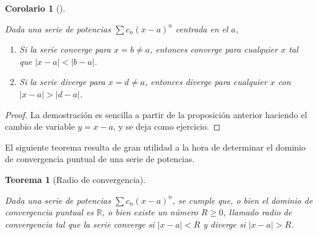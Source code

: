 \documentclass[
  a4paper,
]{scrreport}
\providecommand{\tightlist}{%
  \setlength{\itemsep}{0pt}\setlength{\parskip}{0pt}}\usepackage{longtable,booktabs,array}
\theoremstyle{definition}
\theoremstyle{plain}
\newtheorem{corollary}{Corolario}[chapter]
\theoremstyle{definition}
\theoremstyle{definition}
\theoremstyle{plain}
\newtheorem{theorem}{Teorema}[chapter]
\theoremstyle{plain}
\theoremstyle{remark}
\begin{document}
\begin{corollary}[]\protect\hypertarget{cor-intervalo-convergencia-serie-potencias}{}\label{cor-intervalo-convergencia-serie-potencias}

Dada una serie de potencias \(\sum c_n(x-a)^n\) centrada en el \(a\),

\begin{enumerate}
\def\labelenumi{\alph{enumi}.}
\tightlist
\item
  Si la serie converge para \(x=b\neq a\), entonces converge para
  cualquier \(x\) tal que \(|x-a|<|b-a|\).
\item
  Si la serie diverge para \(x=d\neq a\), entonces diverge para
  cualquier \(x\) con \(|x-a|>|d-a|\).
\end{enumerate}

\end{corollary}

\begin{tcolorbox}[enhanced jigsaw, leftrule=.75mm, colbacktitle=quarto-callout-note-color!10!white, toprule=.15mm, opacityback=0, opacitybacktitle=0.6, toptitle=1mm, breakable, bottomtitle=1mm, colframe=quarto-callout-note-color-frame, rightrule=.15mm, titlerule=0mm, title=\textcolor{quarto-callout-note-color}{\faInfo}\hspace{0.5em}{Demostración}, arc=.35mm, left=2mm, bottomrule=.15mm, colback=white, coltitle=black]

\begin{proof}
La demostración es sencilla a partir de la proposición anterior haciendo
el cambio de variable \(y=x-a\), y se deja como ejercicio.
\end{proof}

\end{tcolorbox}

El siguiente teorema resulta de gran utilidad a la hora de determinar el
dominio de convergencia puntual de una serie de potencias.

\begin{theorem}[Radio de
convergencia]\protect\hypertarget{thm-radio-convergencia}{}\label{thm-radio-convergencia}

Dada una serie de potencias \(\sum c_n(x-a)^n\), se cumple que, o bien
el dominio de convergencia puntual es \(\mathbb{R}\), o bien existe un
número \(R\geq 0\), llamado \emph{radio de convergencia} tal que la
serie converge si \(|x-a|<R\) y diverge si \(|x-a|>R\).

\end{theorem}
\end{document}
